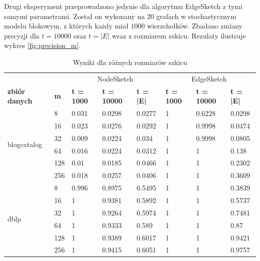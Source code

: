     Drugi eksperyment przeprowadzono jedynie dla algorytmu EdgeSketch z tymi samymi parametrami. Został on wykonany na $20$ grafach w stochastycznym modelu blokowym, z których każdy miał $1000$ wierzchołków. Zbadano zmiany precyzji dla $t = 10000$ oraz $t = |E|$ wraz z rozmiarem szkicu. Rezulaty ilustruje wykres \ref{fig:precision_m}.
    \begin{table}[!ht]
        \small
        \centering
        \begin{tabular}{|l|l|l|l|l|l|l|l|}
        \hline
        & & \multicolumn{3}{c|}{NodeSketch} & \multicolumn{3}{c|}{EdgeSketch} \\ \cline{1-8}
                \textbf{zbiór danych} & \textbf{m} & \textbf{t = 1000} & \textbf{t = 10000} & \textbf{t = |E|} & \textbf{t = 1000} & \textbf{t = 10000} & \textbf{t = |E|} \\ \hline\hline
        \multirow{6}{*}{blogcatalog} & 8 & 0.031 & 0.0298 & 0.0277 & 1 & 0.6228 & 0.0298 \\ \cline{2-8}
            & 16 & 0.023 & 0.0276 & 0.0292 & 1 & 0.9998 & 0.0474 \\ \cline{2-8}
            & 32 & 0.009 & 0.0224 & 0.034 & 1 & 0.9998 & 0.0805 \\ \cline{2-8}
            & 64 & 0.016 & 0.0224 & 0.0312 & 1 & 1 & 0.138 \\ \cline{2-8}
            & 128 & 0.01 & 0.0185 & 0.0466 & 1 & 1 & 0.2302 \\ \cline{2-8}
            & 256 & 0.018 & 0.0257 & 0.0406 & 1 & 1 & 0.3609 \\ \hline\hline
        \multirow{6}{*}{dblp} & 8 & 0.996 & 0.8975 & 0.5495 & 1 & 1 & 0.3839 \\ \cline{2-8}
            & 16 & 1 & 0.9381 & 0.5892 & 1 & 1 & 0.5737 \\ \cline{2-8}
            & 32 & 1 & 0.9264 & 0.5974 & 1 & 1 & 0.7481 \\ \cline{2-8}
            & 64 & 1 & 0.9333 & 0.589 & 1 & 1 & 0.87 \\ \cline{2-8}
            & 128 & 1 & 0.9389 & 0.6017 & 1 & 1 & 0.9421 \\ \cline{2-8}
            & 256 & 1 & 0.9415 & 0.6051 & 1 & 1 & 0.9757 \\ \hline
        \end{tabular}
        \caption{Wyniki dla różnych rozmiarów szkicu}
        \label{tab:sketch_size}
    \end{table}

